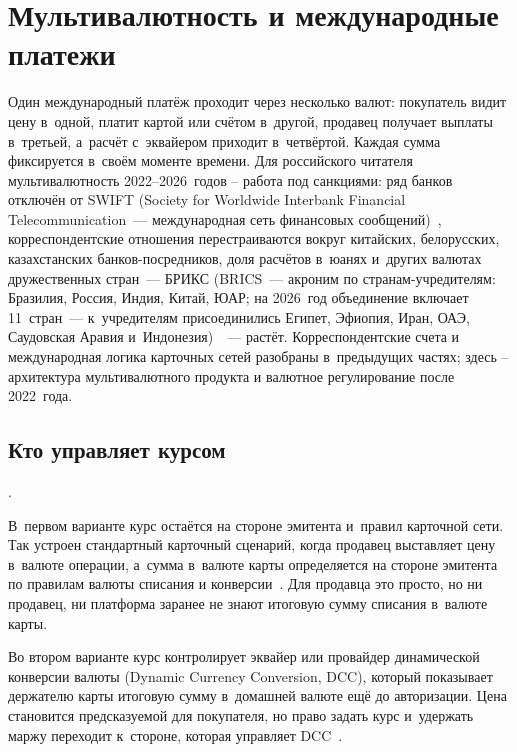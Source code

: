 
\chapter{Мультивалютность и международные платежи}\label{ch:multicurrency}
Один международный платёж проходит через несколько
валют: покупатель видит цену в~одной, платит картой
или счётом в~другой, продавец получает выплаты в~третьей,
а~расчёт с~эквайером приходит в~четвёртой. Каждая сумма
фиксируется в~своём моменте времени. Для российского читателя
мультивалютность 2022--2026~годов -- работа под санкциями:
ряд банков отключён от SWIFT (Society for Worldwide
Interbank Financial Telecommunication~--- международная сеть
финансовых сообщений)~\cite{swift-overview}, корреспондентские
отношения перестраиваются вокруг китайских, белорусских,
казахстанских банков-посредников, доля расчётов
в~юанях и~других валютах дружественных стран~--- БРИКС
(BRICS~--- акроним по странам-учредителям: Бразилия, Россия, Индия,
Китай, ЮАР; на 2026~год объединение включает 11~стран~---
к~учредителям присоединились Египет, Эфиопия, Иран, ОАЭ,
Саудовская Аравия и~Индонезия)~\cite{brics-2026-chair}~---
растёт. Корреспондентские
счета и международная логика карточных сетей разобраны
в~предыдущих частях; здесь -- архитектура мультивалютного
продукта и валютное регулирование после 2022~года.

\section{Кто управляет курсом}\label{sec:mc-currencies}

.

В~первом варианте курс остаётся на стороне эмитента и~правил
карточной сети. Так устроен стандартный карточный сценарий,
когда продавец выставляет цену в~валюте операции, а~сумма
в~валюте карты определяется на стороне эмитента по правилам
валюты списания и конверсии~\cite{visa-core-rules,mc-dcc-guide}.
Для продавца это просто, но ни продавец, ни платформа
заранее не знают итоговую сумму списания в~валюте карты.

Во втором варианте курс контролирует эквайер или провайдер
динамической конверсии валюты (Dynamic Currency Conversion,
DCC), который показывает держателю карты итоговую сумму
в~домашней валюте ещё до авторизации. Цена становится
предсказуемой для покупателя, но право задать курс
и~удержать маржу переходит к~стороне, которая управляет
DCC~\cite{visa-core-rules,mc-dcc-guide}.

